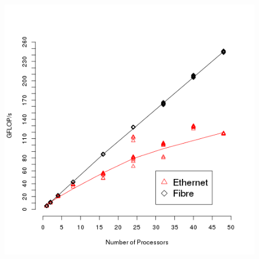 \begin{frame}
		\begin{figure}
				\includegraphics[width=0.8\linewidth]{figures/diagrams/connection/connection}
		\end{figure}
\end{frame}


